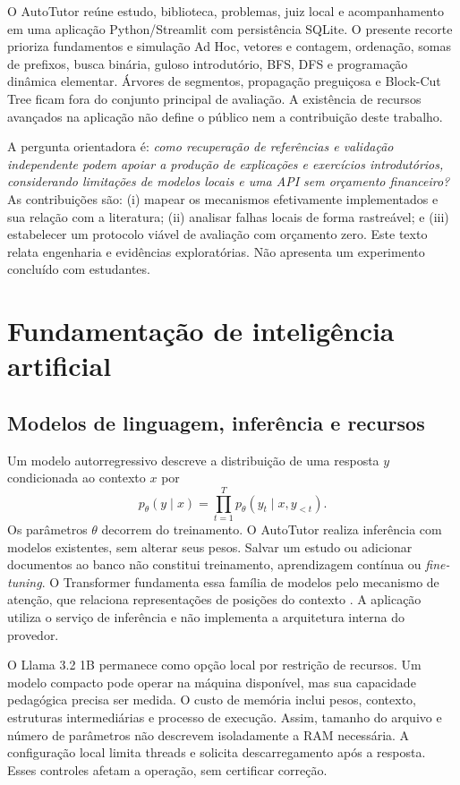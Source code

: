 \documentclass[12pt]{article}
\begin{document}
O AutoTutor reúne estudo, biblioteca, problemas, juiz local e acompanhamento em uma aplicação Python/Streamlit com persistência SQLite. O presente recorte prioriza fundamentos e simulação Ad Hoc, vetores e contagem, ordenação, somas de prefixos, busca binária, guloso introdutório, BFS, DFS e programação dinâmica elementar. Árvores de segmentos, propagação preguiçosa e Block-Cut Tree ficam fora do conjunto principal de avaliação. A existência de recursos avançados na aplicação não define o público nem a contribuição deste trabalho.

A pergunta orientadora é: \emph{como recuperação de referências e validação independente podem apoiar a produção de explicações e exercícios introdutórios, considerando limitações de modelos locais e uma API sem orçamento financeiro?} As contribuições são: (i) mapear os mecanismos efetivamente implementados e sua relação com a literatura; (ii) analisar falhas locais de forma rastreável; e (iii) estabelecer um protocolo viável de avaliação com orçamento zero. Este texto relata engenharia e evidências exploratórias. Não apresenta um experimento concluído com estudantes.

\section{Fundamentação de inteligência artificial}
\subsection{Modelos de linguagem, inferência e recursos}
Um modelo autorregressivo descreve a distribuição de uma resposta $y$ condicionada ao contexto $x$ por
\begin{equation}
p_\theta(y\mid x)=\prod_{t=1}^{T}p_\theta(y_t\mid x,y_{<t}).
\end{equation}
Os parâmetros $\theta$ decorrem do treinamento. O AutoTutor realiza inferência com modelos existentes, sem alterar seus pesos. Salvar um estudo ou adicionar documentos ao banco não constitui treinamento, aprendizagem contínua ou \emph{fine-tuning}. O Transformer fundamenta essa família de modelos pelo mecanismo de atenção, que relaciona representações de posições do contexto \cite{vaswani2017}. A aplicação utiliza o serviço de inferência e não implementa a arquitetura interna do provedor.

O Llama 3.2 1B permanece como opção local por restrição de recursos. Um modelo compacto pode operar na máquina disponível, mas sua capacidade pedagógica precisa ser medida. O custo de memória inclui pesos, contexto, estruturas intermediárias e processo de execução. Assim, tamanho do arquivo e número de parâmetros não descrevem isoladamente a RAM necessária. A configuração local limita threads e solicita descarregamento após a resposta. Esses controles afetam a operação, sem certificar correção.
\end{document}
